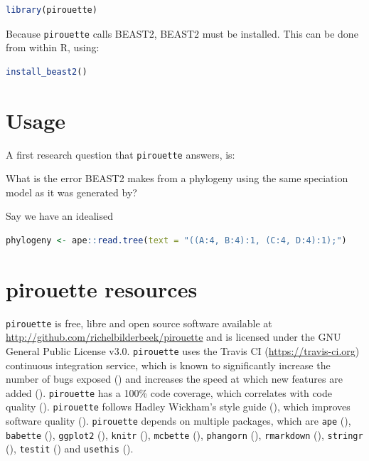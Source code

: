 \documentclass{article}
\begin{document}
\begin{lstlisting}[language=R, floatplacement=H]
library(pirouette)
\end{lstlisting}
Because \verb;pirouette; calls BEAST2, BEAST2 must be installed. 
This can be done from within R, using:

\begin{lstlisting}[language=R, floatplacement=H]
install_beast2()
\end{lstlisting}


\section{Usage}

A first research question that \verb;pirouette; answers, is:

What is the error BEAST2 makes from a phylogeny using the same 
speciation model as it was generated by?

Say we have an idealised

\begin{lstlisting}[language=R, floatplacement=H]
phylogeny <- ape::read.tree(text = "((A:4, B:4):1, (C:4, D:4):1);")
\end{lstlisting}



\section{pirouette resources}

\verb;pirouette; is free, libre and open source software available at 
\url{http://github.com/richelbilderbeek/pirouette}
and is licensed under the GNU General Public License v3.0.
\verb;pirouette; uses the Travis CI (\url{https://travis-ci.org})
continuous integration service, which is known to significantly 
increase the number of bugs exposed (\cite{vasilescu2015}) and increases
the speed at which new features are added (\cite{vasilescu2015}).
\verb;pirouette; has a 100\% code coverage, which correlates with 
code quality (\cite{horgan1994,del1995correlation}). 
\verb;pirouette; follows Hadley Wickham's style guide (\cite{style_guide}), 
which improves software quality (\cite{fang2001}).
\verb;pirouette; depends on multiple packages, which are 
\verb;ape; (\cite{APE}), 
\verb;babette; (\cite{bilderbeek2018babette}),
\verb;ggplot2; (\cite{ggplot2}),
\verb;knitr; (\cite{knitr}),
\verb;mcbette; (\cite{mcbette}),
\verb;phangorn; (\cite{phangorn}),
\verb;rmarkdown; (\cite{rmarkdown}),
\verb;stringr; (\cite{stringr}),
\verb;testit; (\cite{testit}) and 
\verb;usethis; (\cite{usethis}).
\end{document}
